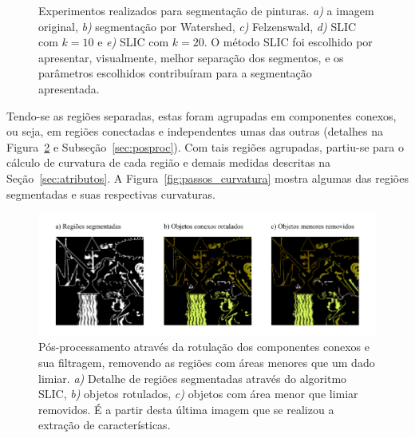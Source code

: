 \begin{figure}[ht!]
\begin{center}
      \caption{Experimentos realizados para segmentação de pinturas. \textit{a)}
        a imagem original, \textit{b)} segmentação por Watershed, \textit{c)}
        Felzenswald, \textit{d)} SLIC com $k=10$ e \textit{e)} SLIC com
        $k=20$. O método SLIC foi escolhido por apresentar, visualmente,
        melhor separação dos segmentos, e os parâmetros escolhidos contribuíram
        para a segmentação apresentada.}
        \label{fig:expsegs}
\end{center}
\end{figure}

Tendo-se as regiões separadas, estas foram agrupadas em componentes
conexos, ou seja, em regiões conectadas e independentes umas das
outras (detalhes na Figura~\ref{fig:rotulacao} e
Subseção~\ref{sec:posproc}). Com tais regiões agrupadas, partiu-se
para o cálculo de curvatura de cada região e demais medidas descritas
na Seção~\ref{sec:atributos}. A Figura~\ref{fig:passos_curvatura} mostra algumas das regiões segmentadas e suas respectivas curvaturas.

\begin{figure}[ht!]
\begin{center}
        \includegraphics[scale=1.2]{figs/passos_rotulacao}
      \caption{Pós-processamento através da rotulação dos componentes
        conexos e sua filtragem, removendo as regiões com áreas
        menores que um dado limiar. \textit{a)} Detalhe de regiões
        segmentadas através do algoritmo SLIC, \textit{b)} objetos
        rotulados, \textit{c)} objetos com área menor que limiar
        removidos. É a partir desta última imagem que se realizou a
        extração de características.}
        \label{fig:rotulacao}
\end{center}
\end{figure}

